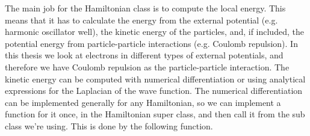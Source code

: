 \documentclass[../main.tex]{subfiles}
\begin{document}
The main job for the Hamiltonian class is to compute the local energy. This means that it has to calculate the energy from the external potential (e.g. harmonic oscillator well), the kinetic energy of the particles, and, if included, the potential energy from particle-particle interactions (e.g. Coulomb repulsion). In this thesis we look at electrons in different types of external potentials, and therefore we have Coulomb repulsion as the particle-particle interaction. The kinetic energy can be computed with numerical differentiation or using analytical expressions for the Laplacian of the wave function. The numerical differentiation can be implemented generally for any Hamiltonian, so we can implement a function for it once, in the Hamiltonian super class, and then call it from the sub class we're using. This is done by the following function.
\lstset{language=c++}
\end{document}
